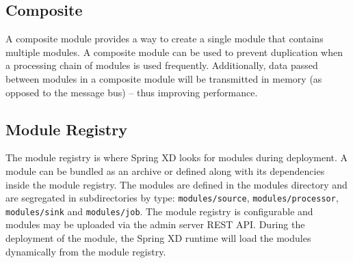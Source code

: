 \subsection{Composite}
A composite module provides a way to create a single module that contains
multiple modules. A composite module can be used to prevent
duplication when a processing chain of modules is used frequently.
Additionally, data passed between modules in a composite module will be
transmitted in memory (as opposed to the message bus) -- thus improving
performance.

\par

\subsection{Module Registry}
The module registry is where Spring XD looks for modules during
deployment. A module can be bundled as an archive or defined along with its
dependencies inside the module registry. The modules are defined in
the modules directory and are segregated in subdirectories by
type: \texttt{modules/source}, \texttt{modules/processor},
\texttt{modules/sink} and \texttt{modules/job}. The module registry is
configurable and modules may be uploaded via the admin server REST API.
During the deployment of the module, the Spring XD runtime will load the modules
dynamically from the module registry.
